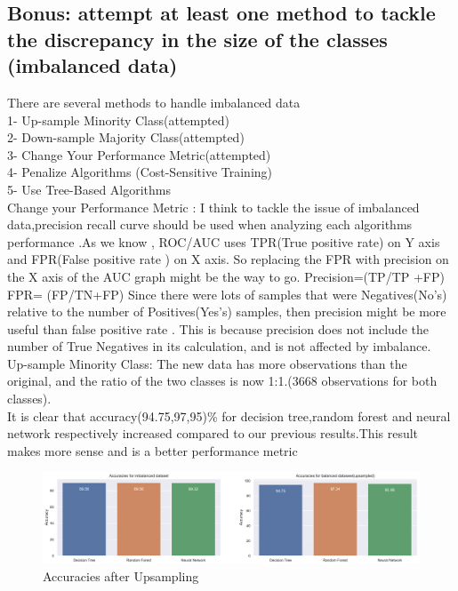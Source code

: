 \subsection{Bonus: attempt at least one method to tackle the discrepancy in the size of the classes (imbalanced data)}
There are several methods to handle imbalanced data\cite{ref_url2}\\
1- Up-sample Minority Class(attempted)\\
2- Down-sample Majority Class(attempted)\\
3- Change Your Performance Metric(attempted)\\
4- Penalize Algorithms (Cost-Sensitive Training)\\
5- Use Tree-Based Algorithms\\
Change your Performance Metric :
 I think to tackle the issue of imbalanced data,precision  recall curve should be used when analyzing each algorithms performance  .As we know , ROC/AUC uses TPR(True positive rate) on Y axis and FPR(False positive rate ) on X axis. So replacing the FPR with precision on the X axis of the AUC graph might be the way to go.
 Precision=(TP/TP +FP) FPR= (FP/TN+FP)
 Since there were lots of samples that were Negatives(No's) relative to the number of Positives(Yes's) samples, then precision might be more useful than false positive rate . This is because precision does not include the number of True Negatives in its calculation, and is not affected by imbalance.\\
 \newline
Up-sample Minority Class:
The new data has more observations than the original, and the ratio of the two classes is now 1:1.(3668 observations for both classes).\\
It is clear that accuracy(94.75,97,95)\% for decision tree,random forest and neural network respectively increased compared to our previous results.This result makes more sense and is a better performance metric
\begin{figure}[!ht]
 \centering
\includegraphics[width=6.1in]{assignment2/1-7-barcharts_up.png}
\caption{\label{fig:fig5}Accuracies after Upsampling }
\end{figure}
